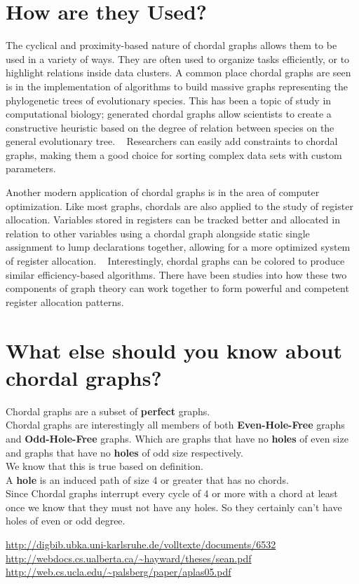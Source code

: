 \section{How are they Used?}
The cyclical and proximity-based nature of chordal graphs allows them to be used in a variety of ways. They are often used to organize
tasks efficiently, or to highlight relations inside data clusters. A common place chordal graphs are seen is in the implementation of algorithms to build
massive graphs representing the phylogenetic trees of evolutionary species. This has been a topic of study in computational biology; generated chordal
graphs allow scientists to create a constructive heuristic based on the degree of relation between species on the general evolutionary tree. ~\cite{kennedy_2005}
Researchers can easily add constraints to chordal graphs, making them a good choice for sorting complex data sets with custom parameters.\par
Another modern application of chordal graphs is in the area of computer optimization. Like most graphs, chordals are also applied to the study of
register allocation. Variables stored in registers can be tracked better and allocated in relation to other variables using a chordal graph alongside
static single assignment to lump declarations together, allowing for a more optimized system of register allocation. ~\cite{hack_2007} Interestingly, chordal graphs
can be colored to produce similar efficiency-based algorithms. There have been studies into how these two components of graph theory can work together to
form powerful and competent register allocation patterns. \cite{pereira_palsberg}\\

\section{What else should you know about chordal graphs?}
Chordal graphs are a subset of \textbf{perfect} graphs.\\
Chordal graphs are interestingly all members of both \textbf{Even-Hole-Free} graphs and \textbf{Odd-Hole-Free} graphs.
Which are graphs that have no \textbf{holes} of even size and graphs that have no \textbf{holes} of odd size respectively.\\
We know that this is true based on definition.\\
A \textbf{hole} is an induced path of size 4 or greater that has no chords.\\
Since Chordal graphs interrupt every cycle of 4 or more with a chord at least once we know that they must not have any holes. So they certainly can't have holes of even or odd degree.

\url{http://digbib.ubka.uni-karlsruhe.de/volltexte/documents/6532}\\
\url{http://webdocs.cs.ualberta.ca/~hayward/theses/sean.pdf}\\
\url{http://web.cs.ucla.edu/~palsberg/paper/aplas05.pdf}



